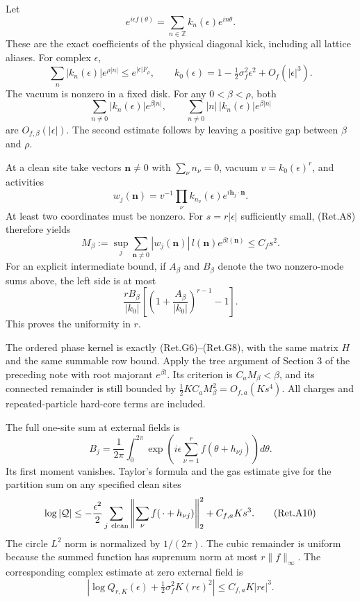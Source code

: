 Let
\[
 e^{i\epsilon f(\theta)}=\sum_{n\in\mathbb Z}k_n(\epsilon)e^{in\theta}.
\]
These are the exact coefficients of the physical diagonal kick,
including all lattice aliases. For complex \(\epsilon\),
\[
 \sum_n|k_n(\epsilon)|e^{\rho|n|}
            \le e^{|\epsilon|F_\rho},\qquad
 k_0(\epsilon)=1-\tfrac12\sigma_f^2\epsilon^2+O_f(|\epsilon|^3).
                                                               \tag{Ret.A8}
\]
The vacuum is nonzero in a fixed disk.
For any \(0<\beta<\rho\), both
\[
 \sum_{n\ne0}|k_n(\epsilon)|e^{\beta|n|},
 \qquad
 \sum_{n\ne0}|n|\,|k_n(\epsilon)|e^{\beta|n|}
\]
are \(O_{f,\beta}(|\epsilon|)\).
The second estimate follows by leaving a positive gap between
\(\beta\) and \(\rho\).

At a clean site take vectors \(\boldsymbol n\ne0\) with
\(\sum_\nu n_\nu=0\), vacuum \(v=k_0(\epsilon)^r\), and activities
\[
 w_j(\boldsymbol n)=v^{-1}\prod_\nu k_{n_\nu}(\epsilon)
                                    e^{i\boldsymbol h_j\cdot\boldsymbol n}.
\]
At least two coordinates must be nonzero.
For \(s=r|\epsilon|\) sufficiently small, (Ret.A8) therefore yields
\[
 M_\beta:=\sup_j\sum_{\boldsymbol n\ne0}
        |w_j(\boldsymbol n)|\,l(\boldsymbol n)e^{\beta l(\boldsymbol n)}
                                        \le C_f s^2.       \tag{Ret.A9}
\]
For an explicit intermediate bound, if \(A_\beta\) and \(B_\beta\)
denote the two nonzero-mode sums above, the left side is at most
\[
 \frac{rB_\beta}{|k_0|}
       \left[\left(1+\frac{A_\beta}{|k_0|}\right)^{r-1}-1\right].
\]
This proves the uniformity in \(r\).

The ordered phase kernel is exactly (Ret.G6)--(Ret.G8), with the same
matrix \(H\) and the same summable row bound.
Apply the tree argument of Section 3 of the preceding note with
root majorant \(e^{\beta l}\).
Its criterion is \(C_aM_\beta<\beta\), and its connected remainder
is still bounded by \(\tfrac12 KC_aM_\beta^2=O_{f,a}(Ks^4)\).
All charges and repeated-particle hard-core terms are included.

The full one-site sum at external fields is
\[
 B_j=\frac1{2\pi}\int_0^{2\pi}
       \exp\left(i\epsilon\sum_{\nu=1}^r f(\theta+h_{\nu j})\right)d\theta.
\]
Its first moment vanishes. Taylor's formula and the gas estimate give
for the partition sum on any specified clean sites
\[
 \log|\mathcal Q|
 \le-\frac{\epsilon^2}{2}\sum_{j\ {\rm clean}}
       \left\|\sum_\nu f(\,\cdot+h_{\nu j})\right\|_2^2
                                            +C_{f,a}Ks^3. \tag{Ret.A10}
\]
The circle \(L^2\) norm is normalized by \(1/(2\pi)\).
The cubic remainder is uniform because the summed function has
supremum norm at most \(r\|f\|_\infty\).
The corresponding complex estimate at zero external field is
\[
 \left|\log Q_{r,K}(\epsilon)
                   +\tfrac12\sigma_f^2K(r\epsilon)^2\right|
                                   \le C_{f,a}K|r\epsilon|^3. \tag{Ret.A11}
\]

